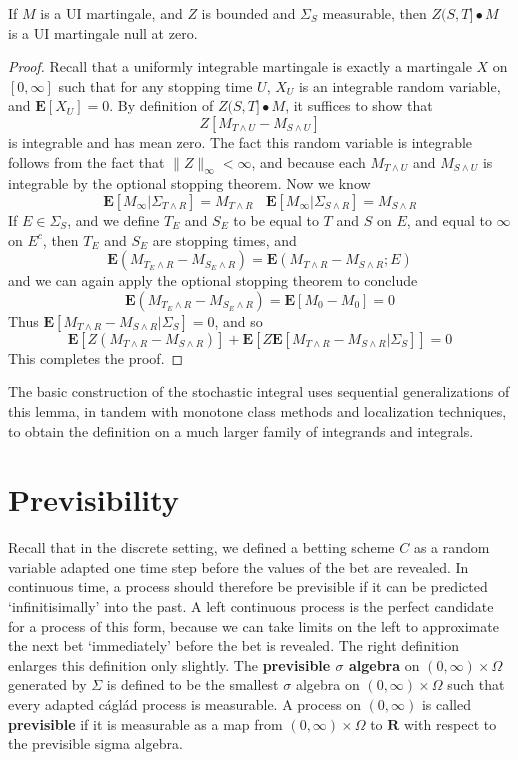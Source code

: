 \begin{lemma}
    If $M$ is a UI martingale, and $Z$ is bounded and $\Sigma_S$ measurable, then $Z(S,T] \bullet M$ is a UI martingale null at zero.
\end{lemma}
\begin{proof}
    Recall that a uniformly integrable martingale is exactly a martingale $X$ on $[0,\infty]$ such that for any stopping time $U$, $X_U$ is an integrable random variable, and $\mathbf{E}[X_U] = 0$. By definition of $Z(S,T] \bullet M$, it suffices to show that
    \[ Z [M_{T \wedge U} - M_{S \wedge U}] \]
    is integrable and has mean zero. The fact this random variable is integrable follows from the fact that $\| Z \|_\infty < \infty$, and because each $M_{T \wedge U}$ and $M_{S \wedge U}$ is integrable by the optional stopping theorem. Now we know
    \[ \mathbf{E}[M_\infty | \Sigma_{T \wedge R}] = M_{T \wedge R}\ \ \ \ \mathbf{E}[M_\infty | \Sigma_{S \wedge R}] = M_{S \wedge R} \]
    If $E \in \Sigma_S$, and we define $T_E$ and $S_E$ to be equal to $T$ and $S$ on $E$, and equal to $\infty$ on $E^c$, then $T_E$ and $S_E$ are stopping times, and
    \[ \mathbf{E}(M_{T_E \wedge R} - M_{S_E \wedge R}) = \mathbf{E}(M_{T \wedge R} - M_{S \wedge R}; E) \]
    and we can again apply the optional stopping theorem to conclude
    \[ \mathbf{E}(M_{T_E \wedge R} - M_{S_E \wedge R}) = \mathbf{E}[M_0 - M_0] = 0 \]
    Thus $\mathbf{E}[M_{T \wedge R} - M_{S \wedge R} | \Sigma_S] = 0$, and so
    \[ \mathbf{E}[Z(M_{T \wedge R} - M_{S \wedge R})] + \mathbf{E}[Z \mathbf{E}[M_{T \wedge R} - M_{S \wedge R} | \Sigma_S] ] = 0 \]
    This completes the proof.
\end{proof}

The basic construction of the stochastic integral uses sequential generalizations of this lemma, in tandem with monotone class methods and localization techniques, to obtain the definition on a much larger family of integrands and integrals.

\section{Previsibility}

Recall that in the discrete setting, we defined a betting scheme $C$ as a random variable adapted one time step before the values of the bet are revealed. In continuous time, a process should therefore be previsible if it can be predicted `infinitisimally' into the past. A left continuous process is the perfect candidate for a process of this form, because we can take limits on the left to approximate the next bet `immediately' before the bet is revealed. The right definition enlarges this definition only slightly. The {\bf previsible $\sigma$ algebra} on $(0,\infty) \times \Omega$ generated by $\Sigma$ is defined to be the smallest $\sigma$ algebra on $(0,\infty) \times \Omega$ such that every adapted c\'{a}gl\'{a}d process is measurable. A process on $(0,\infty)$ is called {\bf previsible} if it is measurable as a map from $(0,\infty) \times \Omega$ to $\mathbf{R}$ with respect to the previsible sigma algebra.

